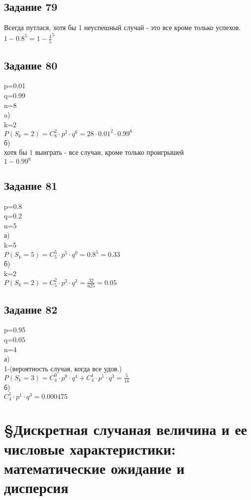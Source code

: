 \documentclass[12pt]{article}
\begin{document}
\subsection{Задание 79}
Всегда путлася, хотя бы 1 неуспешный случай  - это все кроме только успехов.\\
$
1-0.8^5=1-\frac{4}{5}^5
$
\newpage
\subsection{Задание 80}
p=0.01\\
q=0.99\\
n=8\\
a)\\
k=2\\
$
P(S_k=2)=C_{8}^{2}\cdot p^2\cdot q^6 =  28 \cdot 0.01^2\cdot 0.99^6
$\\
б)\\
хотя бы 1 выиграть - все случаи, кроме только проигрышей\\
$
1-0.99^8
$
\newpage
\subsection{Задание 81}
p=0.8\\
q=0.2\\
n=5\\
а)\\
k=5\\
$
P(S_k=5)=C_{5}^{5}\cdot p^5\cdot q^0=0.8^5=0.33
$\\
б)\\
k=2\\
$
P(S_k=2)=C_{5}^{2}\cdot p^2\cdot q^3=\frac{32}{625}=0.05
$
\newpage
\subsection{Задание 82}
p=0.95\\
q=0.05\\
n=4\\
а)\\
1-(вероятность случая, когда все удов.)\\
$
P(S_k=3)=C_{4}^{0}\cdot p^0\cdot q^4 + C_{4}^{1}\cdot p^1\cdot q^3 =  \frac{5}{16} 
$\\
б)\\
$
C_{4}^{1}\cdot p^1\cdot q^3 =  0.000475 
$

\newpage
\section{\S Дискретная случаная величина и ее числовые характеристики: математические ожидание и дисперсия}
\end{document}
